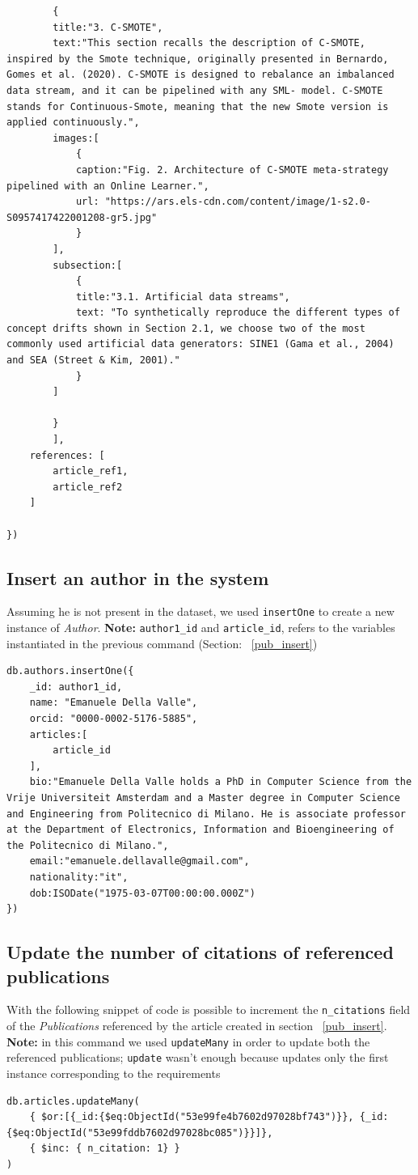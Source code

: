 \documentclass{Configuration_Files/PoliMi3i_thesis}
\begin{document}
\begin{lstlisting}
		{
		title:"3. C-SMOTE",
		text:"This section recalls the description of C-SMOTE, inspired by the Smote technique, originally presented in Bernardo, Gomes et al. (2020). C-SMOTE is designed to rebalance an imbalanced data stream, and it can be pipelined with any SML- model. C-SMOTE stands for Continuous-Smote, meaning that the new Smote version is applied continuously.",
		images:[
			{
			caption:"Fig. 2. Architecture of C-SMOTE meta-strategy pipelined with an Online Learner.",
			url: "https://ars.els-cdn.com/content/image/1-s2.0-S0957417422001208-gr5.jpg"
			}
		],
		subsection:[
			{
			title:"3.1. Artificial data streams",
			text: "To synthetically reproduce the different types of concept drifts shown in Section 2.1, we choose two of the most commonly used artificial data generators: SINE1 (Gama et al., 2004) and SEA (Street & Kim, 2001)."
			}
		]

		}
		],
	references: [
		article_ref1,
		article_ref2
	]

})
\end{lstlisting}


\subsection{Insert an author in the system}
Assuming he is not present in the dataset, we used \verb |insertOne| to create a new instance of \emph{Author}.\newline
\textbf{Note:} \verb |author1_id| and \verb|article_id|, refers to the variables instantiated in the previous
command (Section: ~\ref{pub_insert})
\begin{lstlisting}
db.authors.insertOne({
	_id: author1_id,
	name: "Emanuele Della Valle",
	orcid: "0000-0002-5176-5885",
	articles:[
		article_id
	],
	bio:"Emanuele Della Valle holds a PhD in Computer Science from the Vrije Universiteit Amsterdam and a Master degree in Computer Science and Engineering from Politecnico di Milano. He is associate professor at the Department of Electronics, Information and Bioengineering of the Politecnico di Milano.",
	email:"emanuele.dellavalle@gmail.com",
	nationality:"it",
	dob:ISODate("1975-03-07T00:00:00.000Z")
})
\end{lstlisting}

\subsection{Update the number of citations of referenced publications}
With the following snippet of code is possible to increment the \verb |n_citations| field of the \emph{Publications}
referenced by the article created in section ~\ref{pub_insert}.\newline
\textbf{Note:} in this command we used \verb |updateMany| in order to update both the referenced publications; \verb |update|
wasn't enough because updates only the first instance corresponding to the requirements\\
\begin{lstlisting}
db.articles.updateMany(
	{ $or:[{_id:{$eq:ObjectId("53e99fe4b7602d97028bf743")}}, {_id:{$eq:ObjectId("53e99fddb7602d97028bc085")}}]},
	{ $inc: { n_citation: 1} }
)
\end{lstlisting}
\end{document}

